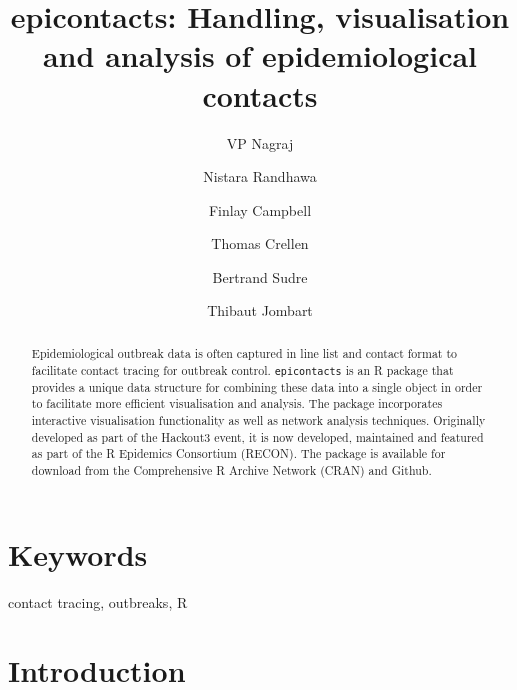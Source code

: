 \documentclass[9pt,a4paper,]{extarticle}
\theoremstyle{definition}
\theoremstyle{definition}
\theoremstyle{definition}
\theoremstyle{remark}
\begin{document}
\pagestyle{front}

\title{epicontacts: Handling, visualisation and analysis of epidemiological contacts}

\author[1]{VP Nagraj}
\author[2]{Nistara Randhawa}
\author[3]{Finlay Campbell}
\author[4]{Thomas Crellen}
\author[5]{Bertrand Sudre}
\author[3]{Thibaut Jombart}

\maketitle
\thispagestyle{front}

\begin{abstract}
Epidemiological outbreak data is often captured in line list and contact format to facilitate contact tracing for outbreak control. \texttt{epicontacts} is an R package that provides a unique data structure for combining these data into a single object in order to facilitate more efficient visualisation and analysis. The package incorporates interactive visualisation functionality as well as network analysis techniques. Originally developed as part of the Hackout3 event, it is now developed, maintained and featured as part of the R Epidemics Consortium (RECON). The package is available for download from the Comprehensive R Archive Network (CRAN) and Github.
\end{abstract}

\section*{Keywords}
contact tracing, outbreaks, R


\clearpage
\pagestyle{main}

\section{Introduction}\label{introduction}
\end{document}
